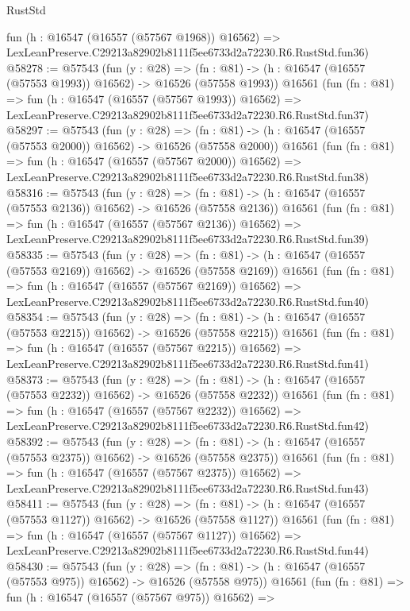 \begin{lexlean}{RustStd}
\begin{coremodule}
    fun (h : @16547 (@16557 (@57567 @1968)) @16562) =>
    LexLeanPreserve.C29213a82902b8111f5ee6733d2a72230.R6.RustStd.fun36)
@58278 := @57543
    (fun (y : @28) =>
    (fn : @81) -> (h : @16547 (@16557 (@57553 @1993)) @16562) -> @16526 (@57558 @1993))
    @16561
    (fun (fn : @81) =>
    fun (h : @16547 (@16557 (@57567 @1993)) @16562) =>
    LexLeanPreserve.C29213a82902b8111f5ee6733d2a72230.R6.RustStd.fun37)
@58297 := @57543
    (fun (y : @28) =>
    (fn : @81) -> (h : @16547 (@16557 (@57553 @2000)) @16562) -> @16526 (@57558 @2000))
    @16561
    (fun (fn : @81) =>
    fun (h : @16547 (@16557 (@57567 @2000)) @16562) =>
    LexLeanPreserve.C29213a82902b8111f5ee6733d2a72230.R6.RustStd.fun38)
@58316 := @57543
    (fun (y : @28) =>
    (fn : @81) -> (h : @16547 (@16557 (@57553 @2136)) @16562) -> @16526 (@57558 @2136))
    @16561
    (fun (fn : @81) =>
    fun (h : @16547 (@16557 (@57567 @2136)) @16562) =>
    LexLeanPreserve.C29213a82902b8111f5ee6733d2a72230.R6.RustStd.fun39)
@58335 := @57543
    (fun (y : @28) =>
    (fn : @81) -> (h : @16547 (@16557 (@57553 @2169)) @16562) -> @16526 (@57558 @2169))
    @16561
    (fun (fn : @81) =>
    fun (h : @16547 (@16557 (@57567 @2169)) @16562) =>
    LexLeanPreserve.C29213a82902b8111f5ee6733d2a72230.R6.RustStd.fun40)
@58354 := @57543
    (fun (y : @28) =>
    (fn : @81) -> (h : @16547 (@16557 (@57553 @2215)) @16562) -> @16526 (@57558 @2215))
    @16561
    (fun (fn : @81) =>
    fun (h : @16547 (@16557 (@57567 @2215)) @16562) =>
    LexLeanPreserve.C29213a82902b8111f5ee6733d2a72230.R6.RustStd.fun41)
@58373 := @57543
    (fun (y : @28) =>
    (fn : @81) -> (h : @16547 (@16557 (@57553 @2232)) @16562) -> @16526 (@57558 @2232))
    @16561
    (fun (fn : @81) =>
    fun (h : @16547 (@16557 (@57567 @2232)) @16562) =>
    LexLeanPreserve.C29213a82902b8111f5ee6733d2a72230.R6.RustStd.fun42)
@58392 := @57543
    (fun (y : @28) =>
    (fn : @81) -> (h : @16547 (@16557 (@57553 @2375)) @16562) -> @16526 (@57558 @2375))
    @16561
    (fun (fn : @81) =>
    fun (h : @16547 (@16557 (@57567 @2375)) @16562) =>
    LexLeanPreserve.C29213a82902b8111f5ee6733d2a72230.R6.RustStd.fun43)
@58411 := @57543
    (fun (y : @28) =>
    (fn : @81) -> (h : @16547 (@16557 (@57553 @1127)) @16562) -> @16526 (@57558 @1127))
    @16561
    (fun (fn : @81) =>
    fun (h : @16547 (@16557 (@57567 @1127)) @16562) =>
    LexLeanPreserve.C29213a82902b8111f5ee6733d2a72230.R6.RustStd.fun44)
@58430 := @57543
    (fun (y : @28) =>
    (fn : @81) -> (h : @16547 (@16557 (@57553 @975)) @16562) -> @16526 (@57558 @975))
    @16561
    (fun (fn : @81) =>
    fun (h : @16547 (@16557 (@57567 @975)) @16562) =>

\end{coremodule}
\end{lexlean}
